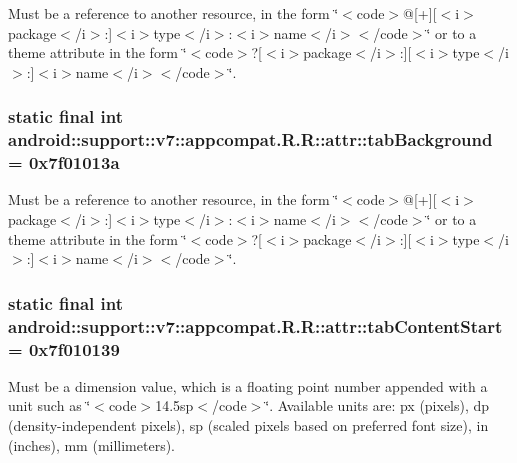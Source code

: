 Must be a reference to another resource, in the form \char`\"{}$<$code$>$@\mbox{[}+\mbox{]}\mbox{[}$<$i$>$package$<$/i$>$:\mbox{]}$<$i$>$type$<$/i$>$:$<$i$>$name$<$/i$>$$<$/code$>$\char`\"{} or to a theme attribute in the form \char`\"{}$<$code$>$?\mbox{[}$<$i$>$package$<$/i$>$:\mbox{]}\mbox{[}$<$i$>$type$<$/i$>$:\mbox{]}$<$i$>$name$<$/i$>$$<$/code$>$\char`\"{}. \hypertarget{classandroid_1_1support_1_1v7_1_1appcompat_1_1_r_1_1attr_08590d533fc05b4fdeab7efb3f739348}{
\subsubsection[{tabBackground}]{\setlength{\rightskip}{0pt plus 5cm}static final int android::support::v7::appcompat.R.R::attr::tabBackground = 0x7f01013a}}
\label{classandroid_1_1support_1_1v7_1_1appcompat_1_1_r_1_1attr_08590d533fc05b4fdeab7efb3f739348}


Must be a reference to another resource, in the form \char`\"{}$<$code$>$@\mbox{[}+\mbox{]}\mbox{[}$<$i$>$package$<$/i$>$:\mbox{]}$<$i$>$type$<$/i$>$:$<$i$>$name$<$/i$>$$<$/code$>$\char`\"{} or to a theme attribute in the form \char`\"{}$<$code$>$?\mbox{[}$<$i$>$package$<$/i$>$:\mbox{]}\mbox{[}$<$i$>$type$<$/i$>$:\mbox{]}$<$i$>$name$<$/i$>$$<$/code$>$\char`\"{}. \hypertarget{classandroid_1_1support_1_1v7_1_1appcompat_1_1_r_1_1attr_0e188179228bab1a024560398fbda3d1}{
\subsubsection[{tabContentStart}]{\setlength{\rightskip}{0pt plus 5cm}static final int android::support::v7::appcompat.R.R::attr::tabContentStart = 0x7f010139}}
\label{classandroid_1_1support_1_1v7_1_1appcompat_1_1_r_1_1attr_0e188179228bab1a024560398fbda3d1}


Must be a dimension value, which is a floating point number appended with a unit such as \char`\"{}$<$code$>$14.5sp$<$/code$>$\char`\"{}. Available units are: px (pixels), dp (density-independent pixels), sp (scaled pixels based on preferred font size), in (inches), mm (millimeters). 

